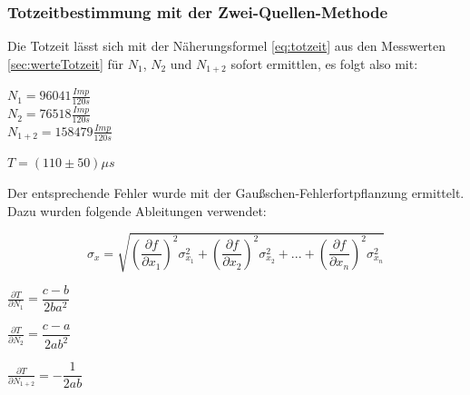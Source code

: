 \subsubsection{Totzeitbestimmung mit der Zwei-Quellen-Methode}
\label{sec:totzeitZ}
Die Totzeit lässt sich mit der Näherungsformel \autoref{eq:totzeit} aus den Messwerten 
\autoref{sec:werteTotzeit} für $N_1$, $N_2$ und $N_{1+2}$ sofort ermittlen, es folgt also mit:
\begin{center}
  $N_1=96041 \frac{Imp}{120 s}$\\
  $N_2=76518 \frac{Imp}{120 s}$\\
  $N_{1+2}=158479 \frac{Imp}{120 s}$
\end{center}
\begin{center}
  $T=(110\pm50) \mu s$
\end{center}
Der entsprechende Fehler wurde mit der Gaußschen-Fehlerfortpflanzung ermittelt.
Dazu wurden folgende Ableitungen verwendet:
\begin{center}
  \begin{equation}
    \label{eq:gaussfehler}  
  \sigma_x=\sqrt{(\frac{\partial f}{\partial x_1})^2\sigma_{x_1}^2+(\frac{\partial f}{\partial x_2})^2\sigma_{x_2}^2+...+(\frac{\partial f}{\partial x_n})^2\sigma_{x_n}^2}
  \end{equation}
  \end{center}
\begin{center}
  $\frac{\partial T}{\partial N_1}=\dfrac{c-b}{2ba^2}$\\
\end{center}
\begin{center}
  $\frac{\partial T}{\partial N_2}=\dfrac{c-a}{2ab^2}$\\
\end{center}
\begin{center}
  $\frac{\partial T}{\partial N_{1+2}}=-\dfrac{1}{2ab}$
\end{center}


